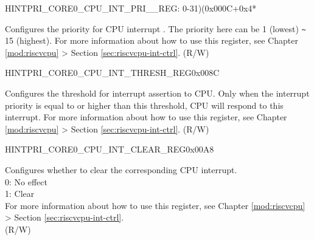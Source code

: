 \begin{register}{H}{INTPRI\_CORE0\_CPU\_INT\_PRI\_\_REG}{: 0-31)(0x000C+0x4*}\label{regdesc:INTPRICORE0CPUINTPRINREG}
%
%
\regnewline%
\begin{regdesc}\begin{reglist}
\label{fielddesc:INTERRUPTCORENCPUPRI0MAP}\item [INTPRI\_CORE0\_CPU\_PRI\_\regindex{n}\_MAP] Configures the priority for CPU interrupt . The priority here can be 1 (lowest) \verb+~+ 15 (highest). For more information about how to use this register, see Chapter \ref{mod:riscvcpu} \textit{} > Section  \ref{sec:riscvcpu-int-ctrl}\textit{}. (R/W)
\end{reglist}\end{regdesc}
\end{register}


\begin{register}{H}{INTPRI\_CORE0\_CPU\_INT\_THRESH\_REG}{0x008C}\label{regdesc:INTPRICORE0CPUINTTHRESHREG}
%
%
\regnewline%
\begin{regdesc}\begin{reglist}
\label{fielddesc:INTPRICORE0CPUINTTHRESH}\item [INTPRI\_CORE0\_CPU\_INT\_THRESH] Configures the threshold for interrupt assertion to CPU. Only when the interrupt priority is equal to or higher than this threshold, CPU will respond to this interrupt. For more information about how to use this register, see Chapter \ref{mod:riscvcpu} \textit{} > Section  \ref{sec:riscvcpu-int-ctrl}\textit{}. (R/W)
\end{reglist}\end{regdesc}
\end{register}




\begin{register}{H}{INTPRI\_CORE0\_CPU\_INT\_CLEAR\_REG}{0x00A8}\label{regdesc:INTPRICORE0CPUINTCLEARREG}
%
\regnewline%
\begin{regdesc}\begin{reglist}
\label{fielddesc:INTPRICORE0CPUINTCLEAR}\item [INTPRI\_CORE0\_CPU\_INT\_CLEAR] Configures whether to clear the corresponding CPU interrupt. \\
0: No effect\\
1: Clear\\
For more information about how to use this register, see Chapter \ref{mod:riscvcpu} \textit{} > Section  \ref{sec:riscvcpu-int-ctrl}\textit{}.\\
(R/W)
\end{reglist}\end{regdesc}
\end{register}



